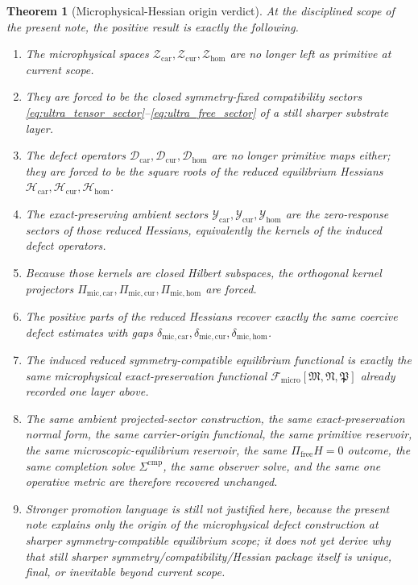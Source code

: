 \documentclass[11pt]{article}
\newcommand{\UltraFunctional}{\mathscr F_{\mathrm{micro}}}
\newcommand{\ProtoTensorClass}{\mathscr Y_{\mathrm{car}}}
\newcommand{\ProtoRelabelClass}{\mathscr Y_{\mathrm{cur}}}
\newcommand{\ProtoFreeClass}{\mathscr Y_{\mathrm{hom}}}
\newcommand{\UltraTensorClass}{\mathscr Z_{\mathrm{car}}}
\newcommand{\UltraRelabelClass}{\mathscr Z_{\mathrm{cur}}}
\newcommand{\UltraFreeClass}{\mathscr Z_{\mathrm{hom}}}
\newcommand{\UltraTensor}{\mathfrak M}
\newcommand{\UltraRelabel}{\mathfrak N}
\newcommand{\UltraFree}{\mathfrak P}
\newcommand{\UltraCarProj}{\Pi_{\mathrm{mic,car}}}
\newcommand{\UltraCurProj}{\Pi_{\mathrm{mic,cur}}}
\newcommand{\UltraHomProj}{\Pi_{\mathrm{mic,hom}}}
\newcommand{\UltraCarGap}{\delta_{\mathrm{mic,car}}}
\newcommand{\UltraCurGap}{\delta_{\mathrm{mic,cur}}}
\newcommand{\UltraHomGap}{\delta_{\mathrm{mic,hom}}}
\newcommand{\TensorDefect}{\mathcal D_{\mathrm{car}}}
\newcommand{\CurDefect}{\mathcal D_{\mathrm{cur}}}
\newcommand{\HomDefect}{\mathcal D_{\mathrm{hom}}}
\newcommand{\TensorHess}{\mathcal H_{\mathrm{car}}}
\newcommand{\CurHess}{\mathcal H_{\mathrm{cur}}}
\newcommand{\HomHess}{\mathcal H_{\mathrm{hom}}}
\newtheorem{theorem}{Theorem}
\begin{document}
\begin{theorem}[Microphysical-Hessian origin verdict]
\label{thm:verdict}
At the disciplined scope of the present note, the positive result is exactly the following.
\begin{enumerate}
    \item The microphysical spaces \(\UltraTensorClass,\UltraRelabelClass,\UltraFreeClass\) are no longer left as primitive at current scope.
    \item They are forced to be the closed symmetry-fixed compatibility sectors \eqref{eq:ultra_tensor_sector}--\eqref{eq:ultra_free_sector} of a still sharper substrate layer.
    \item The defect operators \(\TensorDefect,\CurDefect,\HomDefect\) are no longer primitive maps either; they are forced to be the square roots of the reduced equilibrium Hessians \(\TensorHess,\CurHess,\HomHess\).
    \item The exact-preserving ambient sectors \(\ProtoTensorClass,\ProtoRelabelClass,\ProtoFreeClass\) are the zero-response sectors of those reduced Hessians, equivalently the kernels of the induced defect operators.
    \item Because those kernels are closed Hilbert subspaces, the orthogonal kernel projectors \(\UltraCarProj,\UltraCurProj,\UltraHomProj\) are forced.
    \item The positive parts of the reduced Hessians recover exactly the same coercive defect estimates with gaps \(\UltraCarGap,\UltraCurGap,\UltraHomGap\).
    \item The induced reduced symmetry-compatible equilibrium functional is exactly the same microphysical exact-preservation functional \(\UltraFunctional[\UltraTensor,\UltraRelabel,\UltraFree]\) already recorded one layer above.
    \item The same ambient projected-sector construction, the same exact-preservation normal form, the same carrier-origin functional, the same primitive reservoir, the same microscopic-equilibrium reservoir, the same \(\Pi_{\mathrm{free}}H=0\) outcome, the same completion solve \(\Sigma^{\mathrm{cmp}}\), the same observer solve, and the same one operative metric are therefore recovered unchanged.
    \item Stronger promotion language is still not justified here, because the present note explains only the origin of the microphysical defect construction at sharper symmetry-compatible equilibrium scope; it does not yet derive why that still sharper symmetry/compatibility/Hessian package itself is unique, final, or inevitable beyond current scope.
\end{enumerate}
\end{theorem}
\end{document}
